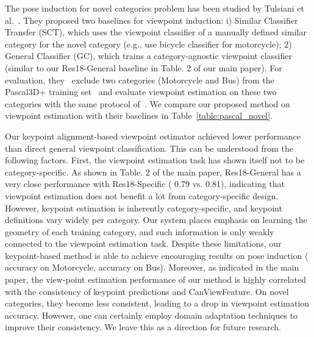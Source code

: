 \documentclass[runningheads]{llncs}
\begin{document}
\begin{table}[t]
\scriptsize
{}
{\caption{Viewpoint estimation of novel categories on Pascal3D+~\cite{xiang2014beyond}. We compare with the baselines from Tulsiani et al.~\cite{tulsiani2015pose} and our re-trained ResNet18~\cite{he2016deep} model. The results are shown in .}
\label{table:pascal_novel}}
\vspace{-0.6cm}
\end{table}

The pose induction for novel categories problem has been studied by Tulsiani et al.~\cite{tulsiani2015pose}.
They proposed two baselines for viewpoint induction: i) Similar Classifier Transfer (SCT), which uses the viewpoint classifier of a manually defined similar category for the novel category (e.g., use bicycle classifier for motorcycle); 
2) General Classifier (GC),  which trains a category-agnostic viewpoint classifier (similar to our Res18-General baseline in Table. 2 of our main paper). 
For evaluation, they~\cite{tulsiani2015pose} exclude two categories (Motorcycle and Bus) from the Pascal3D+ training set~\cite{xiang2014beyond} and evaluate viewpoint estimation on these two categories with the same protocol of~\cite{tulsiani2015viewpoints}. 
We compare our proposed method on viewpoint estimation with their baselines in Table~\ref{table:pascal_novel}. 

Our keypoint alignment-based viewpoint estimator achieved lower performance than direct general viewpoint classification. This can be understood from the following factors. First, the viewpoint estimation task has shown itself not to be category-specific. As shown in Table. 2 of the main paper, Res18-General has a very close performance with Res18-Specific ( 0.79 vs. 0.81), indicating that viewpoint estimation does not benefit a lot from category-specific design.
However, keypoint estimation is inherently category-specific, and keypoint definitions vary widely per category.
Our system places emphasis on learning the geometry of each training category, and such information is only weakly connected to the viewpoint estimation task.
Despite these limitations, our keypoint-based method is able to achieve encouraging results on pose induction ( accuracy on Motorcycle,  accuracy on Bus). Moreover, as indicated in the main paper, the view-point estimation performance of our method is highly correlated with the consistency of keypoint predictions and CanViewFeature. On novel categories, they become less consistent, leading to a drop in viewpoint estimation accuracy. However, one can certainly employ domain adaptation techniques to improve their consistency. We leave this as a direction for future research.
\end{document}
